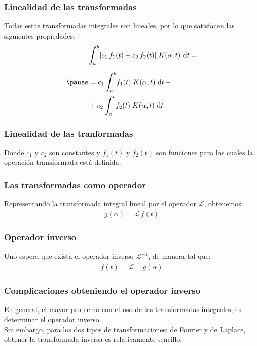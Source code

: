 \documentclass[12pt]{beamer}
\begin{document}
\begin{frame}
\frametitle{Linealidad de las transformadas}
Todas estas transformadas integrales son lineales, por lo que satisfacen las siguientes propiedades:
\pause
\begin{eqnarray}
\begin{aligned}[b]
&\scaleint{6ex}_{\bs a}^{b} [ c_{1} \, f_{1} (t) + c_{2} \, f_{2} (t)] \; K(\alpha, t) \, \dd{t} = \\[0.5em] \pause
&= c_{1} \, \scaleint{6ex}_{\bs a}^{b} f_{1} (t) \; K (\alpha, t) \, \dd{t} + \\
&+ c_{2} \, \scaleint{6ex}_{\bs a}^{b} f_{2} (t) \; K (\alpha, t) \, \dd{t}
\end{aligned}
\label{eq:ecuacion_15_08} 
\end{eqnarray}
\end{frame}
\begin{frame}
\frametitle{Linealidad de las tranformadas}
Donde $c_{1}$ y $c_{2}$ son constantes y $f_{1} (t)$ y $f_{2} (t)$ son funciones para las cuales la operación transformada está definida.
\end{frame}
\begin{frame}
\frametitle{Las transformadas como operador}
Representando la transformada integral lineal por el operador $\mathcal{L}$, obtenemos:
\pause
\begin{align}
g (\alpha) = \mathcal{L} \, f (t)
\label{eq:ecuacion_15_10}
\end{align}
\end{frame}
\begin{frame}
\frametitle{Operador inverso}
Uno espera que exista el operador inverso $\mathcal{L}^{-1}$, de manera tal que:
\pause
\begin{align}
f (t) = \mathcal{L}^{-1}  \; g (\alpha)
\label{eq:ecuacion_15_11}
\end{align}
\end{frame}
\begin{frame}
\frametitle{Complicaciones obteniendo el operador inverso}
En general, el mayor problema con el uso de las transformadas integrales, es determinar el operador inverso.
\\
\bigskip
\pause
Sin embargo, para los dos tipos de transformaciones: de Fourier y de Laplace, obtener la transformada inversa es relativamente sencillo.
\end{frame}
\end{document}
